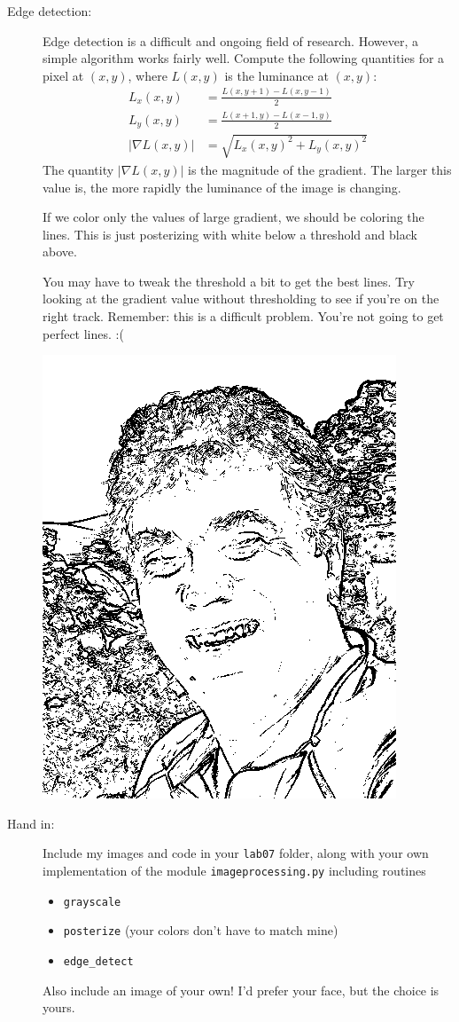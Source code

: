 \documentclass[12pt]{article}
\begin{document}
\begin{description}
\item[Edge detection:] Edge detection is a difficult and
ongoing field of research.  However, a simple algorithm
works fairly well.  Compute the following quantities
for a pixel at $(x,y)$, where $L(x,y)$ is the luminance
at $(x,y)$:
\begin{align*}
L_x(x,y) &= \frac{L(x,y+1) - L(x,y-1)}{2}\\
L_y(x,y) &= \frac{L(x+1,y) - L(x-1,y)}{2}\\
|\nabla L(x,y)| &= \sqrt{L_x(x,y)^2 + L_y(x,y)^2}
\end{align*}
The quantity $|\nabla L(x,y)|$ is the magnitude of the gradient.
The larger this value is, the more rapidly the luminance
of the image is changing.

If we color only the values of large gradient, we should be
coloring the lines.   This is just posterizing with
white below a threshold and black above.

You may have to tweak the threshold a bit
to get the best lines.  Try looking at the gradient
value without thresholding to see if you're on the right 
track. Remember:  this is a difficult problem.
You're not going to get perfect lines.  :(

\includegraphics[scale=0.25]{edge.png}


\item[Hand in:] Include my images and code in your \lstinline{lab07}
folder, along with your own implementation of the module
\lstinline{imageprocessing.py} including routines
\begin{itemize}
\item \lstinline{grayscale}
\item \lstinline{posterize}  (your colors don't have to match mine)
\item \lstinline{edge_detect}
\end{itemize}
Also include an image of your own! I'd prefer your face, but the
choice is yours.


\end{description}
\end{document}
